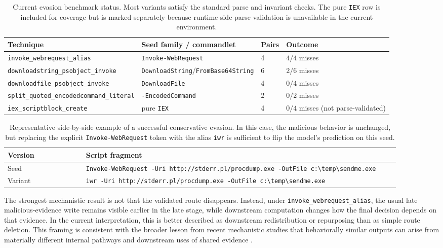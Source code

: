 \documentclass{article}
\begin{document}
\begin{table}[t]
\centering
\caption{Current evasion benchmark status. Most variants satisfy the standard parse and invariant checks. The pure \texttt{IEX} row is included for coverage but is marked separately because runtime-side parse validation is unavailable in the current environment.}
\label{tab:evasion-results}
\begin{tabular}{llll}
\toprule
Technique & Seed family / commandlet & Pairs & Outcome \\
\midrule
\texttt{invoke\_webrequest\_alias} & \texttt{Invoke-WebRequest} & 4 & $4/4$ misses \\
\texttt{downloadstring\_psobject\_invoke} & \texttt{DownloadString}/\texttt{FromBase64String} & 6 & $2/6$ misses \\
\texttt{downloadfile\_psobject\_invoke} & \texttt{DownloadFile} & 4 & $0/4$ misses \\
\texttt{split\_quoted\_encodedcommand\_literal} & \texttt{-EncodedCommand} & 2 & $0/2$ misses \\
\texttt{iex\_scriptblock\_create} & pure \texttt{IEX} & 4 & $0/4$ misses (not parse-validated) \\
\bottomrule
\end{tabular}
\end{table}

\begin{table}[t]
\centering
\caption{Representative side-by-side example of a successful conservative evasion. In this case, the malicious behavior is unchanged, but replacing the explicit \texttt{Invoke-WebRequest} token with the alias \texttt{iwr} is sufficient to flip the model's prediction on this seed.}
\label{tab:evasion-example}
\begin{tabular}{p{0.18\linewidth} p{0.72\linewidth}}
\toprule
Version & Script fragment \\
\midrule
Seed & \texttt{Invoke-WebRequest -Uri http://stderr.pl/procdump.exe -OutFile c:\textbackslash temp\textbackslash sendme.exe} \\
Variant & \texttt{iwr -Uri http://stderr.pl/procdump.exe -OutFile c:\textbackslash temp\textbackslash sendme.exe} \\
\bottomrule
\end{tabular}
\end{table}

The strongest mechanistic result is not that the validated route disappears. Instead, under \texttt{invoke\_webrequest\_alias}, the usual late malicious-evidence write remains visible earlier in the late stage, while downstream computation changes how the final decision depends on that evidence. In the current interpretation, this is better described as downstream redistribution or repurposing than as simple route deletion. This framing is consistent with the broader lesson from recent mechanistic studies that behaviorally similar outputs can arise from materially different internal pathways and downstream uses of shared evidence \citep{lindsey2025biology}.
\end{document}
